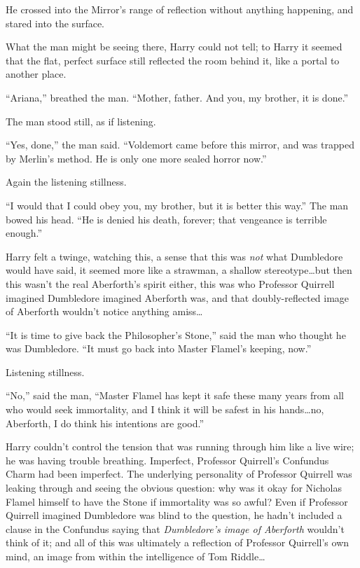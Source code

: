 He crossed into the Mirror’s range of reflection without anything happening, and stared into the surface.

What the man might be seeing there, Harry could not tell; to Harry it seemed that the flat, perfect surface still reflected the room behind it, like a portal to another place.

“Ariana,” breathed the man. “Mother, father. And you, my brother, it is done.”

The man stood still, as if listening.

“Yes, done,” the man said. “Voldemort came before this mirror, and was trapped by Merlin’s method. He is only one more sealed horror now.”

Again the listening stillness.

“I would that I could obey you, my brother, but it is better this way.” The man bowed his head. “He is denied his death, forever; that vengeance is terrible enough.”

Harry felt a twinge, watching this, a sense that this was \emph{not} what Dumbledore would have said, it seemed more like a strawman, a shallow stereotype…but then this wasn’t the real Aberforth’s spirit either, this was who Professor Quirrell imagined Dumbledore imagined Aberforth was, and that doubly-reflected image of Aberforth wouldn’t notice anything amiss…

“It is time to give back the Philosopher’s Stone,” said the man who thought he was Dumbledore. “It must go back into Master Flamel’s keeping, now.”

Listening stillness.

“No,” said the man, “Master Flamel has kept it safe these many years from all who would seek immortality, and I think it will be safest in his hands…no, Aberforth, I do think his intentions are good.”

Harry couldn’t control the tension that was running through him like a live wire; he was having trouble breathing. Imperfect, Professor Quirrell’s Confundus Charm had been imperfect. The underlying personality of Professor Quirrell was leaking through and seeing the obvious question: why was it okay for Nicholas Flamel himself to have the Stone if immortality was so awful? Even if Professor Quirrell imagined Dumbledore was blind to the question, he hadn’t included a clause in the Confundus saying that \emph{Dumbledore’s image of Aberforth} wouldn’t think of it; and all of this was ultimately a reflection of Professor Quirrell’s own mind, an image from within the intelligence of Tom Riddle…

